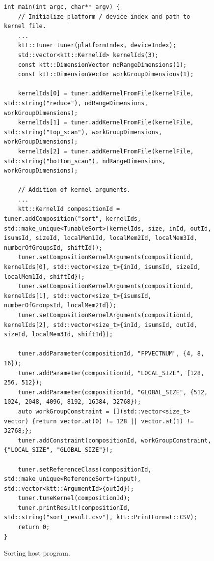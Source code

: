 \documentclass
[
    digital, %
    oneside, %
    table, %
    nolof, %
    nolot, %
    nocover %
]{fithesis3}
\begin{document}
\begin{figure}
\footnotesize
\begin{adjustwidth}{-1cm}{-1cm}
\begin{lstlisting}
int main(int argc, char** argv) {
    // Initialize platform / device index and path to kernel file.
    ...
    ktt::Tuner tuner(platformIndex, deviceIndex);
    std::vector<ktt::KernelId> kernelIds(3);
    const ktt::DimensionVector ndRangeDimensions(1);
    const ktt::DimensionVector workGroupDimensions(1);
    
    kernelIds[0] = tuner.addKernelFromFile(kernelFile, std::string("reduce"), ndRangeDimensions, workGroupDimensions);
    kernelIds[1] = tuner.addKernelFromFile(kernelFile, std::string("top_scan"), workGroupDimensions, workGroupDimensions);
    kernelIds[2] = tuner.addKernelFromFile(kernelFile, std::string("bottom_scan"), ndRangeDimensions, workGroupDimensions);
    
    // Addition of kernel arguments.
    ...
    ktt::KernelId compositionId = tuner.addComposition("sort", kernelIds, std::make_unique<TunableSort>(kernelIds, size, inId, outId, isumsId, sizeId, localMem1Id, localMem2Id, localMem3Id, numberOfGroupsId, shiftId));
    tuner.setCompositionKernelArguments(compositionId, kernelIds[0], std::vector<size_t>{inId, isumsId, sizeId, localMem1Id, shiftId});
    tuner.setCompositionKernelArguments(compositionId, kernelIds[1], std::vector<size_t>{isumsId, numberOfGroupsId, localMem2Id});
    tuner.setCompositionKernelArguments(compositionId, kernelIds[2], std::vector<size_t>{inId, isumsId, outId, sizeId, localMem3Id, shiftId});
    
    tuner.addParameter(compositionId, "FPVECTNUM", {4, 8, 16});
    tuner.addParameter(compositionId, "LOCAL_SIZE", {128, 256, 512});
    tuner.addParameter(compositionId, "GLOBAL_SIZE", {512, 1024, 2048, 4096, 8192, 16384, 32768});
    auto workGroupConstraint = [](std::vector<size_t> vector) {return vector.at(0) != 128 || vector.at(1) != 32768;};
    tuner.addConstraint(compositionId, workGroupConstraint, {"LOCAL_SIZE", "GLOBAL_SIZE"});
    
    tuner.setReferenceClass(compositionId, std::make_unique<ReferenceSort>(input), std::vector<ktt::ArgumentId>{outId});
    tuner.tuneKernel(compositionId);
    tuner.printResult(compositionId, std::string("sort_result.csv"), ktt::PrintFormat::CSV);
    return 0;
}
\end{lstlisting}
\caption{Sorting host program.}
\label{sort-example-main}
\end{adjustwidth}
\end{figure}
\end{document}
